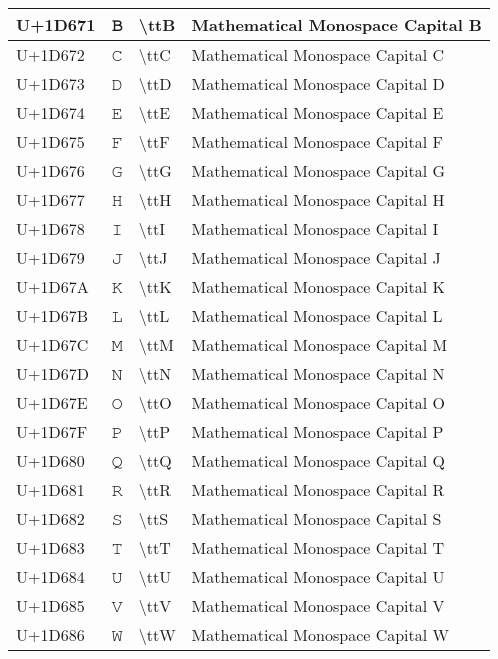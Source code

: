 \begin{table}[h]
\begin{tabulary}{\linewidth}{|L|L|L|L|}
\hline
U+1D671 & 𝙱 & {\textbackslash}ttB & Mathematical Monospace Capital B \\
\hline
U+1D672 & 𝙲 & {\textbackslash}ttC & Mathematical Monospace Capital C \\
\hline
U+1D673 & 𝙳 & {\textbackslash}ttD & Mathematical Monospace Capital D \\
\hline
U+1D674 & 𝙴 & {\textbackslash}ttE & Mathematical Monospace Capital E \\
\hline
U+1D675 & 𝙵 & {\textbackslash}ttF & Mathematical Monospace Capital F \\
\hline
U+1D676 & 𝙶 & {\textbackslash}ttG & Mathematical Monospace Capital G \\
\hline
U+1D677 & 𝙷 & {\textbackslash}ttH & Mathematical Monospace Capital H \\
\hline
U+1D678 & 𝙸 & {\textbackslash}ttI & Mathematical Monospace Capital I \\
\hline
U+1D679 & 𝙹 & {\textbackslash}ttJ & Mathematical Monospace Capital J \\
\hline
U+1D67A & 𝙺 & {\textbackslash}ttK & Mathematical Monospace Capital K \\
\hline
U+1D67B & 𝙻 & {\textbackslash}ttL & Mathematical Monospace Capital L \\
\hline
U+1D67C & 𝙼 & {\textbackslash}ttM & Mathematical Monospace Capital M \\
\hline
U+1D67D & 𝙽 & {\textbackslash}ttN & Mathematical Monospace Capital N \\
\hline
U+1D67E & 𝙾 & {\textbackslash}ttO & Mathematical Monospace Capital O \\
\hline
U+1D67F & 𝙿 & {\textbackslash}ttP & Mathematical Monospace Capital P \\
\hline
U+1D680 & 𝚀 & {\textbackslash}ttQ & Mathematical Monospace Capital Q \\
\hline
U+1D681 & 𝚁 & {\textbackslash}ttR & Mathematical Monospace Capital R \\
\hline
U+1D682 & 𝚂 & {\textbackslash}ttS & Mathematical Monospace Capital S \\
\hline
U+1D683 & 𝚃 & {\textbackslash}ttT & Mathematical Monospace Capital T \\
\hline
U+1D684 & 𝚄 & {\textbackslash}ttU & Mathematical Monospace Capital U \\
\hline
U+1D685 & 𝚅 & {\textbackslash}ttV & Mathematical Monospace Capital V \\
\hline
U+1D686 & 𝚆 & {\textbackslash}ttW & Mathematical Monospace Capital W \\

\end{tabulary}
\end{table}
